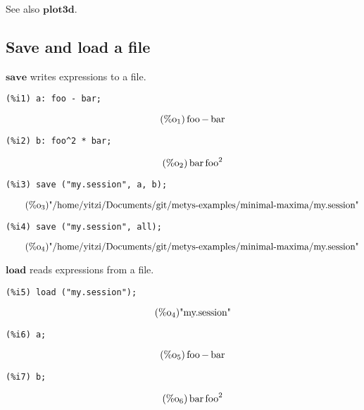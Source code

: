 \documentclass[12pt,leqno]{article}
\begin{document}
See also $\mathbf{plot3d}$.

\subsection{Save and load a file}

$\mathbf{save}$ writes expressions to a file.
\begin{verbatim}
(%i1) a: foo - bar;
\end{verbatim}
\begin{equation}
\tag{$\mathop{\mathrm{\%o}_{1}}$}\mathop{\mathrm{foo}}-\mathop{\mathrm{bar}}
\label{eq:doc-group1-code32-1-1}
\end{equation}
\begin{verbatim}
(%i2) b: foo^2 * bar;
\end{verbatim}
\begin{equation}
\tag{$\mathop{\mathrm{\%o}_{2}}$}\mathop{\mathrm{bar}} {\mathop{\mathrm{foo}}}^{2}
\label{eq:doc-group1-code32-2-1}
\end{equation}
\begin{verbatim}
(%i3) save ("my.session", a, b);
\end{verbatim}
\begin{equation}
\tag{$\mathop{\mathrm{\%o}_{3}}$}\mbox{"/home/yitzi/Documents/git/metys-examples/minimal-maxima/my.session"}
\label{eq:doc-group1-code32-3-1}
\end{equation}
\begin{verbatim}
(%i4) save ("my.session", all);
\end{verbatim}
\begin{equation}
\tag{$\mathop{\mathrm{\%o}_{4}}$}\mbox{"/home/yitzi/Documents/git/metys-examples/minimal-maxima/my.session"}
\label{eq:doc-group1-code32-4-1}
\end{equation}


$\mathbf{load}$ reads expressions from a file.
\begin{verbatim}
(%i5) load ("my.session");
\end{verbatim}
\begin{equation}
\tag{$\mathop{\mathrm{\%o}_{4}}$}\mbox{"my.session"}
\label{eq:doc-group1-code33-1-1}
\end{equation}
\begin{verbatim}
(%i6) a;
\end{verbatim}
\begin{equation}
\tag{$\mathop{\mathrm{\%o}_{5}}$}\mathop{\mathrm{foo}}-\mathop{\mathrm{bar}}
\label{eq:doc-group1-code33-2-1}
\end{equation}
\begin{verbatim}
(%i7) b;
\end{verbatim}
\begin{equation}
\tag{$\mathop{\mathrm{\%o}_{6}}$}\mathop{\mathrm{bar}} {\mathop{\mathrm{foo}}}^{2}
\label{eq:doc-group1-code33-3-1}
\end{equation}
\end{document}
